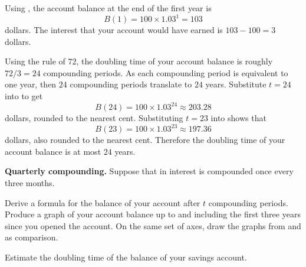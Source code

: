 \documentclass[a4paper,oneside,12pt]{article}
\begin{document}
{\begin{solution}
Using , the
account balance at the end of the first year is
\[
B(1)
=
100 \times 1.03^1
=
103
\]
dollars.  The interest that your account would have earned is
$103 - 100 = 3$ dollars.

Using the rule of $72$, the doubling time of your account balance is
roughly $72 / 3 = 24$ compounding periods.  As each compounding period
is equivalent to one year, then $24$ compounding periods translate to
$24$ years.  Substitute $t = 24$ into
 to get
\[
B(24)
=
100 \times 1.03^{24}
\approx
203.28
\]
dollars, rounded to the nearest cent.  Substituting $t = 23$ into
 shows that
\[
B(23)
=
100 \times 1.03^{23}
\approx
197.36
\]
dollars, also rounded to the nearest cent.  Therefore the doubling
time of your account balance is at most $24$ years.
\end{solution}
}{}

\begin{example}
\label{eg:exponential:savings_quarterly_compounding}
\textbf{Quarterly compounding.}
Suppose that in  interest is
compounded once every three months.
\begin{packedenum}
\item\label{subeg:exponential:savings_quarterly_formula}
  Derive a formula for the balance of your account after $t$
  compounding periods.  Produce a graph of your account balance up to
  and including the first three years since you opened the account.
  On the same set of axes, draw the graphs from
  and
  as comparison.

\item\label{subeg:exponential:savings_quarterly_doubling_time}
  Estimate the doubling time of the balance of your savings account.
\end{packedenum}
\end{example}
\end{document}

